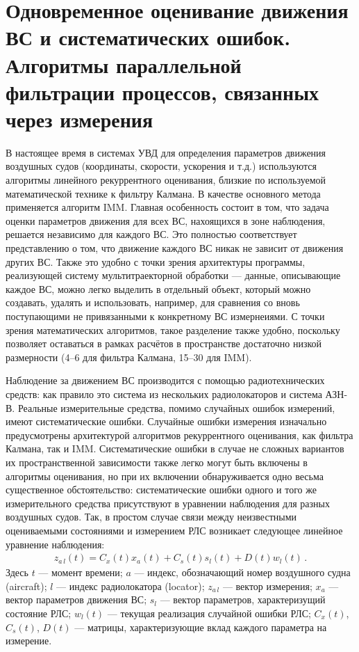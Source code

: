 ﻿\chapter{Одновременное оценивание движения ВС и систематических ошибок. Алгоритмы параллельной фильтрации процессов, связанных через измерения}
\renewcommand{\headtext}{\thechapter.~Одновременное оценивание движения ВС и систематических ошибок}

В настоящее время в системах УВД для определения параметров движения воздушных судов 
(координаты, скорости, ускорения и т.д.) используются алгоритмы линейного рекуррентного оценивания, 
близкие по используемой математической технике к фильтру Калмана. 
В качестве основного метода применяется алгоритм IMM. 
Главная особенность состоит в том, 
что задача оценки параметров движения для всех ВС, нахоящихся в зоне наблюдения, 
решается независимо для каждого ВС. 
Это полностью соответствует представлению о том, 
что движение каждого ВС никак не зависит от движения других ВС. 
Также это удобно с точки зрения архитектуры программы, 
реализующей систему мультитраекторной обработки --- 
данные, описывающие каждое ВС, можно легко выделить в отдельный объект, 
который можно создавать, удалять и использовать, например, для сравнения 
со вновь поступающими не привязанными к конкретному ВС измернеиями. 
С точки зрения математических алгоритмов, такое разделение также удобно, 
поскольку позволяет оставаться в рамках расчётов в пространстве достаточно низкой размерности 
(4--6 для фильтра Калмана, 15--30 для IMM). 

Наблюдение за движением ВС производится с помощью радиотехнических средств: 
как правило это система из нескольких радиолокаторов и система АЗН-В. 
Реальные измерительные средства, помимо случайных ошибок измерений, 
имеют систематические ошибки. 
Случайные ошибки измерения изначально предусмотрены архитектурой алгоритмов 
рекуррентного оценивания, как фильтра Калмана, так и IMM. 
Систематические ошибки в случае не сложных вариантов их пространственной зависимости 
также легко могут быть включены в алгоритмы оценивания, 
но при их включении обнаруживается одно весьма существенное обстоятельство: 
систематические ошибки одного и того же измерительного средства 
присутствуют в уравнении наблюдения для разных воздушных судов. 
Так, в простом случае связи между неизвестными оцениваемыми состояниями и измерением РЛС 
возникает следующее линейное уравнение наблюдения: 
\begin{gather}
  z_{a \, l}(t) = C_x(t) x_a(t) + C_s(t) s_l(t) + D(t) w_l(t) \,. 
  \label{Bedin:eq:obs-x-s-simple}
\end{gather}
Здесь $t$ --- момент времени; $a$ --- индекс, обозначающий номер воздушного судна (aircraft); 
$l$ --- индекс радиолокатора (locator); $z_{a \, l}$ --- вектор измерения; 
$x_a$ --- вектор параметров движения ВС; 
$s_l$ --- вектор параметров, характеризущий состояние РЛС; $w_l(t)$ --- текущая реализация 
случайной ошибки РЛС; $C_x(t)$, $C_s(t)$, $D(t)$ --- матрицы, характеризующие вклад 
каждого параметра на измерение. 

